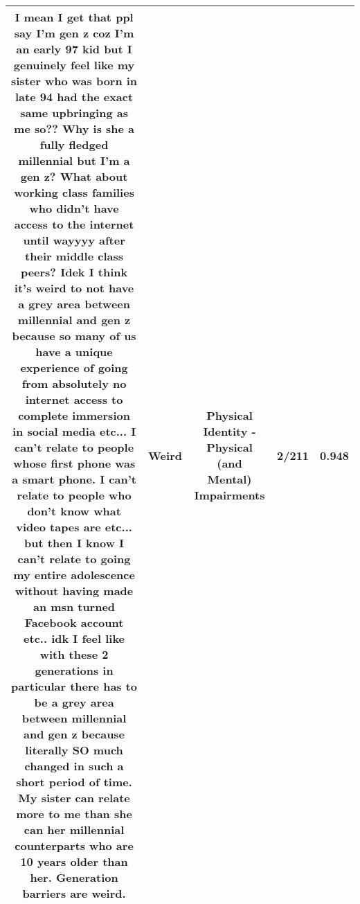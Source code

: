 \documentclass[11pt]{article}
\newlength\mylength
\begin{document}
\begin{center}
\begin{longtable}{|C{.65\mylength}|C{.30\mylength}|C{.12\mylength}|C{.12\mylength}|C{.12\mylength}|}
  \small I mean I get that ppl say I'm gen z coz I'm an early 97 kid but I genuinely feel like my sister who was born in late 94 had the exact same upbringing as me so?? Why is she a fully fledged millennial but I'm a gen z? What about working class families who didn't have access to the internet until wayyyy after their middle class peers? Idek I think it's \textbf{weird} to not have a grey area between millennial and gen z because so many of us have a unique experience of going from absolutely no internet access to complete immersion in social media etc... I can't relate to people whose first phone was a smart phone. I can't relate to people who don't know what video tapes are etc... but then I know I can't relate to going my entire adolescence without having made an msn turned Facebook account etc..  idk I feel like with these 2  generations in particular there has to be a grey area between millennial and gen z because literally SO much changed in such a short period of time. My sister can relate more to me than she can her millennial counterparts who are 10 years older than her. Generation barriers are \textbf{weird}.\normalsize   & Weird & Physical Identity - Physical (and Mental) Impairments & 2/211 & 0.948 \\  \hline

\end{longtable}
\end{center}
\end{document}
